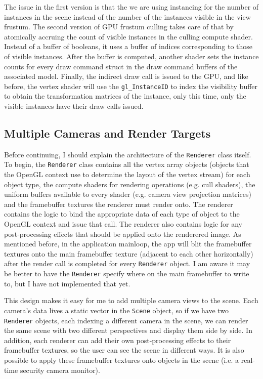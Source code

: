 \documentclass[letterpaper, 10 pt, conference]{ieeeconf}  %
\begin{document}
The issue in the first version is that the we are using instancing for the number of instances in the scene instead of the number of the instances visible in the view frustum. The second version of GPU frustum culling takes care of that by atomically accruing the count of visible instances in the culling compute shader. Instead of a buffer of booleans, it uses a buffer of indices corresponding to those of visible instances. After the buffer is computed, another shader sets the instance counts for every draw command struct in the draw command buffers of the associated model. Finally, the indirect draw call is issued to the GPU, and like before, the vertex shader will use the \texttt{gl\_InstanceID} to index the visibility buffer to obtain the transformation matrices of the instance, only this time, only the visible instances have their draw calls issued.

\subsection {Multiple Cameras and Render Targets}
Before continuing, I should explain the architecture of the \texttt{Renderer} class itself. To begin, the \texttt{Renderer} class contains all the vertex array objects (objects that the OpenGL context use to determine the layout of the vertex stream) for each object type, the compute shaders for rendering operations (e.g. cull shaders), the uniform buffers available to every shader (e.g. camera view projection matrices) and the framebuffer textures the renderer must render onto. The renderer contains the logic to bind the appropriate data of each type of object to the OpenGL context and issue that call. The renderer also contains logic for any post-processing effects that should be applied onto the renderered image. As mentioned before, in the application mainloop, the app will blit the framebuffer textures onto the main framebuffer texture (adjacent to each other horizontally) after the render call is completed for every \texttt{Renderer} object. I am aware it may be better to have the \texttt{Renderer} specify where on the main framebuffer to write to, but I have not implemented that yet. 

This design makes it easy for me to add multiple camera views to the scene. Each camera's data lives a static vector in the \texttt{Scene} object, so if we have two \texttt{Renderer} objects, each indexing a different camera in the scene, we can render the same scene with two different perspectives and display them side by side. In addition, each renderer can add their own post-processing effects to their framebuffer textures, so the user can see the scene in different ways. It is also possible to apply these framebuffer textures onto objects in the scene (i.e. a real-time security camera monitor).
\end{document}
